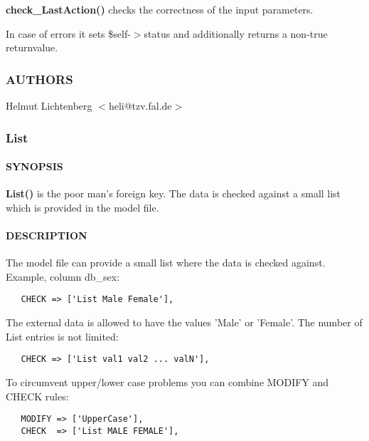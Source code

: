 \textbf{check\_LastAction()} checks the correctness of the input parameters.



In case of errors it sets \$self-$>$status and additionally returns a non-true
returnvalue.

\subsubsection{AUTHORS\label{AUTHORS}}


Helmut Lichtenberg $<$heli@tzv.fal.de$>$

\subsubsection{List\label{List}}




\paragraph*{SYNOPSIS\label{List_SYNOPSIS}}


\textbf{List()} is the poor man's foreign key. The data is checked against a
small list which is provided in the model file.

\paragraph*{DESCRIPTION\label{List_DESCRIPTION}}


The model file can provide a small list where the data is checked against.
Example, column db\_sex:

\begin{verbatim}
   CHECK => ['List Male Female'],
\end{verbatim}


The external data is allowed to have the values 'Male' or 'Female'. The
number of List entries is not limited:

\begin{verbatim}
   CHECK => ['List val1 val2 ... valN'],
\end{verbatim}


To circumvent upper/lower case problems you can combine MODIFY and CHECK
rules:

\begin{verbatim}
   MODIFY => ['UpperCase'],
   CHECK  => ['List MALE FEMALE'],
\end{verbatim}



